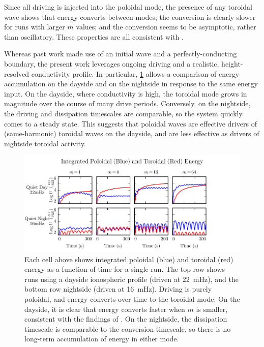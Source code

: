 \documentclass[draft,linenumbers]{agujournal}
\begin{document}
Since all driving is injected into the poloidal mode, the presence of any toroidal wave shows that energy converts between modes; the conversion is clearly slower for runs with larger $m$ values; and the conversion seems to be asymptotic, rather than oscillatory. These properties are all consistent with \citet{mann_1995}.

Whereas past work made use of an initial wave and a perfectly-conducting boundary, the present work leverages ongoing driving and a realistic, height-resolved conductivity profile. In particular, \cref{fig_energy} allows a comparison of energy accumulation on the dayside and on the nightside in response to the same energy input. On the dayside, where conductivity is high, the toroidal mode grows in magnitude over the course of many drive periods. Conversely, on the nightside, the driving and dissipation timescales are comparable, so the system quickly comes to a steady state. This suggests that poloidal waves are effective drivers of (same-harmonic) toroidal waves on the dayside, and are less effective as drivers of nightside toroidal activity.

\begin{figure}
    \begin{center}
    \includegraphics[width=\textwidth]{figures/fig_energy.pdf}
    \caption{
        Each cell above shows integrated poloidal (blue) and toroidal (red) energy as a function of time for a single run. The top row shows runs using a dayside ionospheric profile (driven at \SI{22}{\mHz}), and the bottom row nightside (driven at \SI{16}{\mHz}). Driving is purely poloidal, and energy converts over time to the toroidal mode. On the dayside, it is clear that energy converts faster when $m$ is smaller, consistent with the findings of \citet{mann_1995}. On the nightside, the dissipation timescale is comparable to the conversion timescale, so there is no long-term accumulation of energy in either mode.
    }
    \label{fig_energy}
    \end{center}
\end{figure}
\end{document}
